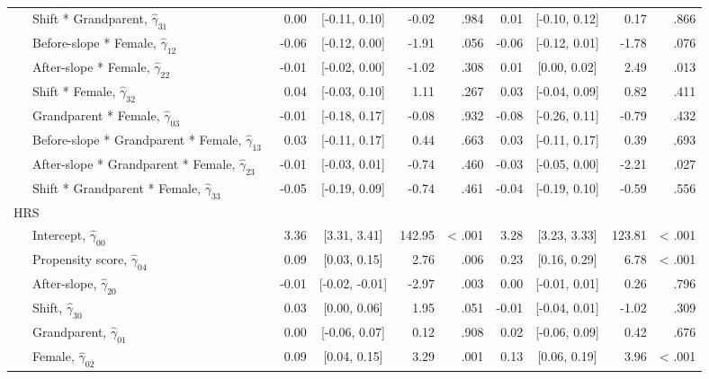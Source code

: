 \documentclass[
  english,
  man, noextraspace]{apa7}
\newenvironment{lltable}{\begin{landscape}\begin{center}\begin{ThreePartTable}}{\end{ThreePartTable}\end{center}\end{landscape}}
\begin{document}
\begin{appendix}
\begin{lltable}
{\begin{longtable}{lrcrrrcrr}
\ \ \ Shift * Grandparent, $\hat{\gamma}_{31}$ \textcolor{white}{L} & 0.00 & [-0.11, 0.10] & -0.02 & .984 & 0.01 & [-0.10, 0.12] & 0.17 & .866\\
\ \ \ Before-slope * Female, $\hat{\gamma}_{12}$ & -0.06 & [-0.12, 0.00] & -1.91 & .056 & -0.06 & [-0.12, 0.01] & -1.78 & .076\\
\ \ \ After-slope * Female, $\hat{\gamma}_{22}$ \textcolor{white}{L} & -0.01 & [-0.02, 0.00] & -1.02 & .308 & 0.01 & [0.00, 0.02] & 2.49 & .013\\
\ \ \ Shift * Female, $\hat{\gamma}_{32}$ \textcolor{white}{L} & 0.04 & [-0.03, 0.10] & 1.11 & .267 & 0.03 & [-0.04, 0.09] & 0.82 & .411\\
\ \ \ Grandparent * Female, $\hat{\gamma}_{03}$ \textcolor{white}{L} & -0.01 & [-0.18, 0.17] & -0.08 & .932 & -0.08 & [-0.26, 0.11] & -0.79 & .432\\
\ \ \ Before-slope * Grandparent * Female, $\hat{\gamma}_{13}$ & 0.03 & [-0.11, 0.17] & 0.44 & .663 & 0.03 & [-0.11, 0.17] & 0.39 & .693\\
\ \ \ After-slope * Grandparent * Female, $\hat{\gamma}_{23}$ \textcolor{white}{L} & -0.01 & [-0.03, 0.01] & -0.74 & .460 & -0.03 & [-0.05, 0.00] & -2.21 & .027\\
\ \ \ Shift * Grandparent * Female, $\hat{\gamma}_{33}$ \textcolor{white}{L} & -0.05 & [-0.19, 0.09] & -0.74 & .461 & -0.04 & [-0.19, 0.10] & -0.59 & .556\\
HRS &  &  &  &  &  &  &  & \\
\ \ \ Intercept, $\hat{\gamma}_{00}$ \textcolor{white}{H} & 3.36 & [3.31, 3.41] & 142.95 & < .001 & 3.28 & [3.23, 3.33] & 123.81 & < .001\\
\ \ \ Propensity score, $\hat{\gamma}_{04}$ \textcolor{white}{H} & 0.09 & [0.03, 0.15] & 2.76 & .006 & 0.23 & [0.16, 0.29] & 6.78 & < .001\\
\ \ \ After-slope, $\hat{\gamma}_{20}$ \textcolor{white}{H} & -0.01 & [-0.02, -0.01] & -2.97 & .003 & 0.00 & [-0.01, 0.01] & 0.26 & .796\\
\ \ \ Shift, $\hat{\gamma}_{30}$ \textcolor{white}{H} & 0.03 & [0.00, 0.06] & 1.95 & .051 & -0.01 & [-0.04, 0.01] & -1.02 & .309\\
\ \ \ Grandparent, $\hat{\gamma}_{01}$ \textcolor{white}{H} & 0.00 & [-0.06, 0.07] & 0.12 & .908 & 0.02 & [-0.06, 0.09] & 0.42 & .676\\
\ \ \ Female, $\hat{\gamma}_{02}$ \textcolor{white}{H} & 0.09 & [0.04, 0.15] & 3.29 & .001 & 0.13 & [0.06, 0.19] & 3.96 & < .001\\

\end{longtable}}
\end{lltable}
\end{appendix}
\end{document}
